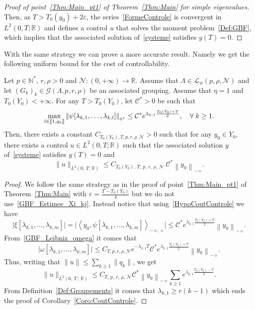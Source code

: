 \documentclass[AHL,Unicode,longabstracts]{cedram}
\newcommand{\llbracket}{\mathopen{[\mkern -2.7mu[}}
\newcommand{\rrbracket}{\mathclose{]\mkern -2.7mu]}}
\newcommand{\inter}[2]{\llbracket #1,#2 \rrbracket}
\newcommand{\Fzp}{Y_0}
\newcommand{\normeXalphas}[1]{\left\| #1 \right\|_{\diamond^*}}
\newcommand{\normeXmalpha}[1]{\left\| #1 \right\|_{-\diamond}}
\newcommand{\dual}[2]{\left\langle #1, #2 \right\rangle_{-\diamond,\diamond}}
\newcommand{\n}{g}
\newcommand{\LL}{\mathcal{L}}
\newcommand{\NN}{\mathcal{N}}
\newcommand{\N}{\mathbb{N}}
\newcommand{\R}{\mathbb{R}}
\let\oldforall\forall
\renewcommand*{\forall}{\mathrel{\oldforall}}
\begin{document}
\begin{proof}[Proof of point~\eqref{Thm:Main_pt1} of Theorem~\ref{Thm:Main} for simple eigenvalues]
Then, as $T>T_0(y_0) + 2 \varepsilon$, the series~\eqref{FormeControle} is convergent in $L^2(0,T ; \R)$ and defines a control $u$ that solves the moment problem~\eqref{Def:GBF}, which implies that the associated solution of~\eqref{systeme} satisfies $y(T)=0$.
\end{proof}



With the same strategy we can prove a more accurate result. Namely we get the following uniform bound for the cost of controllability.
\begin{coro} \label{Coro:CoutControle}
Let $p \in \N^*$, $r, \rho > 0$ and $\NN : (0,+\infty) \to \R$. Assume that $\Lambda \in \LL_w(p,\rho, \NN)$ and let $(G_k)_k\in \mathcal{G}(\Lambda,p,r,\rho)$ be an associated grouping. Assume that $\eta=1$ and $T_0(\Fzp) < +\infty$. For any $T>T_0(\Fzp)$, let $\mathcal{C}^*>0 $ be such that
\begin{equation}\label{HypoCoutControle}
\max_{l \in \inter{1}{\n_k}} \normeXalphas{\psi[\lambda_{k,1}, \dots, \lambda_{k,l}]} \leq \mathcal{C}^* e^{\lambda_{k,1} \frac{T_0(\Fzp)+T}{2}}, \quad \forall k \geq 1.
\end{equation}
Then, there exists a constant $C_{T_0(\Fzp),T,p,r,\rho, \NN}>0$ such that for any $y_0 \in \Fzp$, there exists a control $u \in L^2(0,T ; \R)$ such that the associated solution $y$ of~\eqref{systeme} satisfies $y(T) = 0$ and
\[
\| u \|_{L^2(0,\,T;\,\R)} \leq C_{T_0(\Fzp),\,T,\,p,\,r,\,\rho,\,\NN}\ \mathcal{C}^* \normeXmalpha{ y_0 }.
\]
\end{coro}

\begin{proof}
We follow the same strategy as in the proof of point~\eqref{Thm:Main_pt1} of Theorem~\ref{Thm:Main} with $\varepsilon = \frac{T-T_0(\Fzp)}{4}$ but we do not use~\eqref{GBF_Estimee_Xi_kj}. Instead notice that using~\eqref{HypoCoutControle} we have
\[
\big| \xi[\lambda_{k,1}, \dots, \lambda_{k,m}] \big| = \big| \dual{ y_0}{ \psi[\lambda_{k,1}, \dots, \lambda_{k,m}]} \big|
\leq \mathcal{C}^* e^{\lambda_{k,1} \frac{T_0(\Fzp)+T}{2}} \normeXmalpha{ y_0 }.
\]
From~\eqref{GBF_Leibniz_omega} it comes that
\[
\big| \omega[\lambda_{k,1}, \dots, \lambda_{k,m}] \big| \leq C_{T,p,r,\rho,\NN} e^{-\lambda_{k,1} T} \mathcal{C}^* e^{\lambda_{k,1} \frac{T_0(\Fzp)+T}{2}} \normeXmalpha{ y_0}.
\]
Thus, writing that $\|u\|\leq \sum_{k\geq 1} \|q_k\|$, we get
\begin{equation*}
\| u \|_{L^2(0,\,T\,;\,\R)}
\leq C_{T,\,p,\,r,\,\rho,\,\NN} \mathcal{C}^* \normeXmalpha{ y_0 } \sum_{k \geq 1} e^{\lambda_{k,1} \frac{T_0(\Fzp)-T}{2}}.
\end{equation*}
From Definition~\ref{Def:Groupements} it comes that $\lambda_{k,1} \geq r (k-1)$ which ends the proof of Corollary~\ref{Coro:CoutControle}.
\end{proof}
\end{document}
